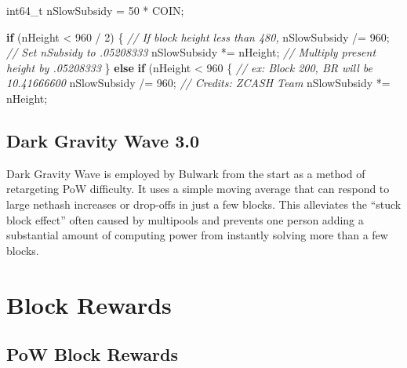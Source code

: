 \documentclass[11pt,a4paperpaper,]{report}
\newenvironment{Shaded}{}{}
\newcommand{\DataTypeTok}[1]{\textcolor[rgb]{0.56,0.13,0.00}{#1}}
\newcommand{\DecValTok}[1]{\textcolor[rgb]{0.25,0.63,0.44}{#1}}
\newcommand{\CommentTok}[1]{\textcolor[rgb]{0.38,0.63,0.69}{\textit{#1}}}
\newcommand{\ControlFlowTok}[1]{\textcolor[rgb]{0.00,0.44,0.13}{\textbf{#1}}}
\newcommand{\NormalTok}[1]{#1}
\begin{document}
\begin{Shaded}
\begin{Highlighting}[]

        \DataTypeTok{int64_t}\NormalTok{ nSlowSubsidy = }\DecValTok{50}\NormalTok{ * COIN;}

        \ControlFlowTok{if}\NormalTok{ (nHeight < }\DecValTok{960}\NormalTok{ / }\DecValTok{2}\NormalTok{) \{        }\CommentTok{// If block height less than 480,}
\NormalTok{           nSlowSubsidy /= }\DecValTok{960}\NormalTok{;         }\CommentTok{// Set nSubsidy to .05208333}
\NormalTok{           nSlowSubsidy *= nHeight;     }\CommentTok{// Multiply present height by .05208333}
\NormalTok{        \} }\ControlFlowTok{else} \ControlFlowTok{if}\NormalTok{ (nHeight < }\DecValTok{960}\NormalTok{ \{      }\CommentTok{// ex: Block 200, BR will be 10.41666600}
\NormalTok{            nSlowSubsidy /= }\DecValTok{960}\NormalTok{;        }\CommentTok{// Credits: ZCASH Team}
\NormalTok{            nSlowSubsidy *= nHeight;}
\end{Highlighting}
\end{Shaded}

\section{Dark Gravity Wave 3.0}\label{dark-gravity-wave-3.0}

Dark Gravity Wave is employed by Bulwark from the start as a method of
retargeting PoW difficulty. It uses a simple moving average that can
respond to large nethash increases or drop-offs in just a few blocks.
This alleviates the ``stuck block effect'' often caused by multipools
and prevents one person adding a substantial amount of computing power
from instantly solving more than a few blocks.

\chapter{Block Rewards}\label{block-rewards}

\section{PoW Block Rewards}\label{pow-block-rewards}
\end{document}
